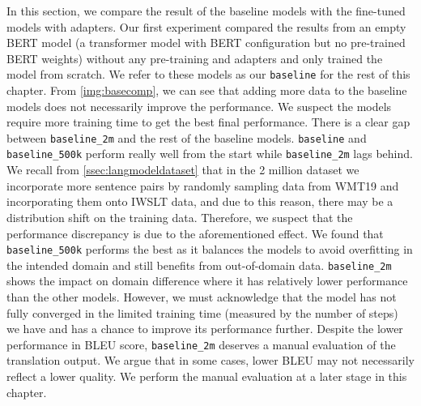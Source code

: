 In this section, we compare the result of the baseline models with the fine-tuned models with adapters. Our first experiment compared the results from an empty BERT model (a transformer model with BERT configuration but no pre-trained BERT weights) without any pre-training and adapters and only trained the model from scratch. We refer to these models as our \texttt{baseline} for the rest of this chapter. From \cref{img:basecomp}, we can see that adding more data to the baseline models does not necessarily improve the performance. We suspect the models require more training time to get the best final performance. There is a clear gap between \texttt{baseline\_2m} and the rest of the baseline models. \texttt{baseline} and \texttt{baseline\_500k} perform really well from the start while \texttt{baseline\_2m} lags behind. 
We recall from \cref{ssec:langmodeldataset} that in the 2 million dataset we incorporate more sentence pairs by randomly sampling data from WMT19 and incorporating them onto IWSLT data, and due to this reason, there may be a distribution shift on the training data. Therefore, we suspect that the performance discrepancy is due to the aforementioned effect.
We found that \texttt{baseline\_500k} performs the best as it balances the models to avoid overfitting in the intended domain and still benefits from out-of-domain data. \texttt{baseline\_2m} shows the impact on domain difference where it has relatively lower performance than the other models. However, we must acknowledge that the model has not fully converged in the limited training time (measured by the number of steps) we have and has a chance to improve its performance further. Despite the lower performance in BLEU score, \texttt{baseline\_2m} deserves a manual evaluation of the translation output. We argue that in some cases, lower BLEU may not necessarily reflect a lower quality. We perform the manual evaluation at a later stage in this chapter.

